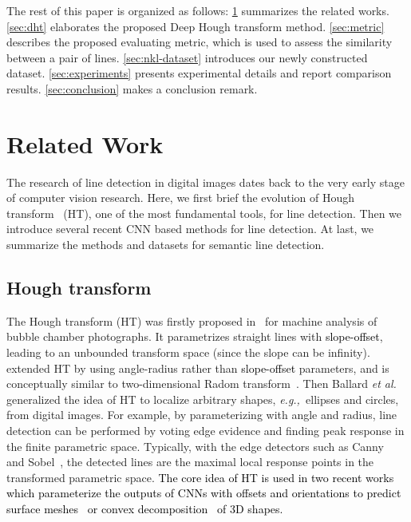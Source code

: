 \documentclass[10pt,journal,cspaper,compsoc]{IEEEtran}
\newcommand{\revise}[1]{{\textcolor{black}{#1}}}
\def\etal{\emph{et al.~}}
\def\eg{\emph{e.g.,~}}
\begin{document}
The rest of this paper is organized as follows:
\cref{sec:related-work} summarizes the related works.
\cref{sec:dht} elaborates the proposed Deep Hough transform method.
\cref{sec:metric} describes the proposed evaluating metric, which is used to assess the similarity between a pair of lines.
\cref{sec:nkl-dataset} introduces our newly constructed dataset.
\cref{sec:experiments} presents experimental details and report comparison results.
\cref{sec:conclusion} makes a conclusion remark.

\section{Related Work}\label{sec:related-work}
The research of line detection in digital images dates back to the very early stage of
computer vision research.
Here, we first brief the evolution of Hough transform~\cite{duda1971use} (HT),
one of the most fundamental tools, for line detection.
Then we introduce several recent CNN based methods for line detection.
At last, we summarize the methods and datasets for semantic line detection.

\subsection{Hough transform}
The Hough transform (HT) was firstly proposed in~\cite{hough1962method} for machine analysis of bubble chamber photographs.
It parametrizes straight lines with \revise{slope-offset}, leading to an unbounded transform space (since the slope can be infinity).
\cite{duda1971use} extended HT by using angle-radius rather than \revise{slope-offset}
parameters, and is conceptually similar to two-dimensional Radom transform~\cite{radon20051}.
Then Ballard \etal \cite{ballard1981generating} generalized the idea of HT to localize arbitrary shapes, \eg ellipses and circles, from digital images.
For example, by parameterizing with angle and radius, line detection can be performed by voting edge evidence and finding peak response in the finite parametric space.
Typically, with the edge detectors such as Canny~\cite{canny1986computational} and Sobel~\cite{sobel},
the detected lines are the maximal local response points in the transformed parametric space.
\revise{The core idea of HT is used in two recent
works which
parameterize the outputs of CNNs with offsets and orientations
to predict surface meshes~\cite{chen2020bsp} or
convex decomposition~\cite{deng2020cvxnet} of 3D shapes.}
\end{document}

